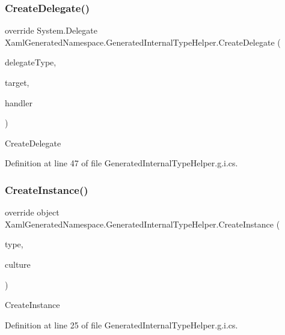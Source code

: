 \subsubsection{\texorpdfstring{CreateDelegate()}{CreateDelegate()}}
{\footnotesize\ttfamily override System.\+Delegate Xaml\+Generated\+Namespace.\+Generated\+Internal\+Type\+Helper.\+Create\+Delegate (\begin{DoxyParamCaption}\item[{System.\+Type}]{delegate\+Type,  }\item[{object}]{target,  }\item[{string}]{handler }\end{DoxyParamCaption})\hspace{0.3cm}{\ttfamily [protected]}}



Create\+Delegate 



Definition at line 47 of file Generated\+Internal\+Type\+Helper.\+g.\+i.\+cs.

\mbox{\label{class_xaml_generated_namespace_1_1_generated_internal_type_helper_aefb7a98fceb9c287cef4756942f441d1}} 
\subsubsection{\texorpdfstring{CreateInstance()}{CreateInstance()}}
{\footnotesize\ttfamily override object Xaml\+Generated\+Namespace.\+Generated\+Internal\+Type\+Helper.\+Create\+Instance (\begin{DoxyParamCaption}\item[{System.\+Type}]{type,  }\item[{System.\+Globalization.\+Culture\+Info}]{culture }\end{DoxyParamCaption})\hspace{0.3cm}{\ttfamily [protected]}}



Create\+Instance 



Definition at line 25 of file Generated\+Internal\+Type\+Helper.\+g.\+i.\+cs.

